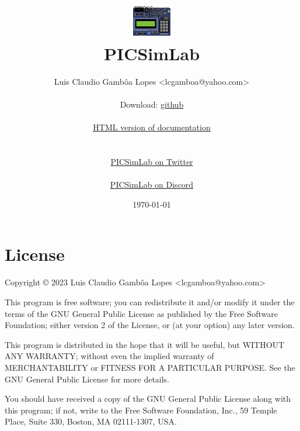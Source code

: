 \documentclass[oneside]{book}
\title{ ~~\\ ~~\\ ~~\\ \includegraphics[scale=1.0]{img/logo.png} \\ PICSimLab \PNversion}
\author{Luis Claudio Gambôa Lopes  <lcgamboa@yahoo.com>\\
\\
{\centering Download: \href{https://github.com/lcgamboa/picsimlab}{github}}
\\
\ifpdf
\\
{\centering \href{https://lcgamboa.github.io/picsimlab\_docs/\PNversion/}{HTML version of documentation}} 
\else
\\
{\centering \hrefb{picsimlab.pdf}{PDF version of documentation}} 
\fi
\\
\\
{\centering \href{https://twitter.com/PICSimLab}{PICSimLab on Twitter}}
\\
\\
{\centering \href{https://discord.gg/fMT8szFYq7}{PICSimLab on Discord}}
}
\date{\today}
\begin{document}
\def\hrefb#1#2{\href{#1}{#2}}
\def\hrefr#1#2{\href{run:#1}{#2}}


\hypersetup{pageanchor=false}
\maketitle
\hypersetup{pageanchor=true}

\ifdefined\HCode\else
\tableofcontents
\fi













\chapter{License}

Copyright © 2023 Luis Claudio Gambôa Lopes <lcgamboa@yahoo.com>

This program is free software; you can redistribute it and/or modify
it under the terms of the GNU General Public License as published by
the Free Software Foundation; either version 2 of the License, or
(at your option) any later version.

This program is distributed in the hope that it will be useful,
but WITHOUT ANY WARRANTY; without even the implied warranty of
MERCHANTABILITY or FITNESS FOR A PARTICULAR PURPOSE. See the
GNU General Public License for more details.

You should have received a copy of the GNU General Public License
along with this program; if not, write to the Free Software
Foundation, Inc., 59 Temple Place, Suite 330,
Boston, MA 02111-1307, USA.

\appendix



\end{document}
